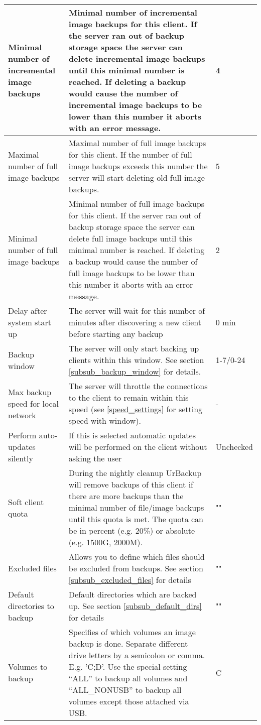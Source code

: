 \documentclass[a4paper,10pt]{article}
\begin{document}
\begin{longtable}{|p{}|p{}|p{}|}
\hline
Minimal number of incremental image backups & Minimal number of incremental image backups for this client. If the server ran out of backup storage space the server can delete incremental image backups until this minimal number is reached. If deleting a backup would cause the number of incremental image backups to be lower than this number it aborts with an error message. & 4\\
\hline
Maximal number of full image backups & Maximal number of full image backups for this client. If the number of
 full image backups exceeds this number the server will start deleting old full image backups. & 5\\
\hline
Minimal number of full image backups & Minimal number of full image backups for this client. If the server ran out of backup storage space the server can delete full image backups until this minimal number is reached. If deleting a backup would cause the number of full image backups to be lower than this number it aborts with an error message. & 2\\
\hline
Delay after system start up & The server will wait for this number of minutes after discovering a new client before starting any backup & 0 min\\
\hline
Backup window & The server will only start backing up clients within this window. See section \ref{subsub_backup_window} for details. & 1-7/0-24\\
\hline
Max backup speed for local network & The server will throttle the connections to the client to remain within this speed (see \ref{speed_settings} for setting speed with window). & -\\
\hline
Perform auto-updates silently & If this is selected automatic updates will be performed on the client without asking the user & Unchecked\\
\hline
Soft client quota & During the nightly cleanup UrBackup will remove backups of this client
if there are more backups than the minimal number of file/image backups until this quota is met. The quota can be in percent (e.g. 20\%) or
absolute (e.g. 1500G, 2000M). & "" \\
\hline
Excluded files & Allows you to define which files should be excluded from backups. See section \ref{subsub_excluded_files} for details & "" \\
\hline
Default directories to backup & Default directories which are backed up. See section \ref{subsub_default_dirs} for details & ""\\
\hline
Volumes to backup & Specifies of which volumes an image backup is done. Separate different drive letters by a semicolon or comma. E.g. 'C;D'. Use the special setting ``ALL'' to backup all volumes and ``ALL\_NONUSB'' to backup all volumes except those attached via USB. & C \\

\end{longtable}
\end{document}
